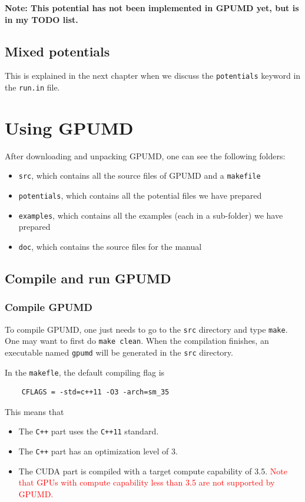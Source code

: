 \documentclass[12pt,a4paper]{report}
\begin{document}
\textbf{Note: This potential has not been implemented in GPUMD yet, but is in my TODO list.}

\section{Mixed potentials}

This is explained in the next chapter when we discuss the \verb"potentials" keyword in the \verb"run.in" file.


\chapter{Using GPUMD \label{chapter:usage}}

After downloading and unpacking GPUMD, one can see the following folders:
\begin{itemize}
\item \verb"src", which contains all the source files of GPUMD and a \verb"makefile"
\item \verb"potentials", which contains all the potential files we have prepared
\item \verb"examples", which contains all the examples (each in a sub-folder) we have prepared
\item \verb"doc", which contains the source files for the manual
\end{itemize}


\section{Compile and run GPUMD}

\subsection{Compile GPUMD}

To compile GPUMD, one just needs to go to the \verb"src" directory and type \verb"make". One may want to first do \verb"make clean". When the compilation finishes, an executable named \verb"gpumd" will be generated in the \verb"src" directory.

In the \verb"makefle", the default compiling flag is
\begin{verbatim}
    CFLAGS = -std=c++11 -O3 -arch=sm_35
\end{verbatim}
This means that
\begin{itemize}
\item The \verb"C++" part uses the \verb"C++11" standard.
\item The \verb"C++" part has an optimization level of 3.
\item The CUDA part is compiled with a target compute capability of 3.5. \textcolor{red}{Note that GPUs with compute capability less than 3.5 are not supported by GPUMD.}
\end{itemize}
\end{document}
